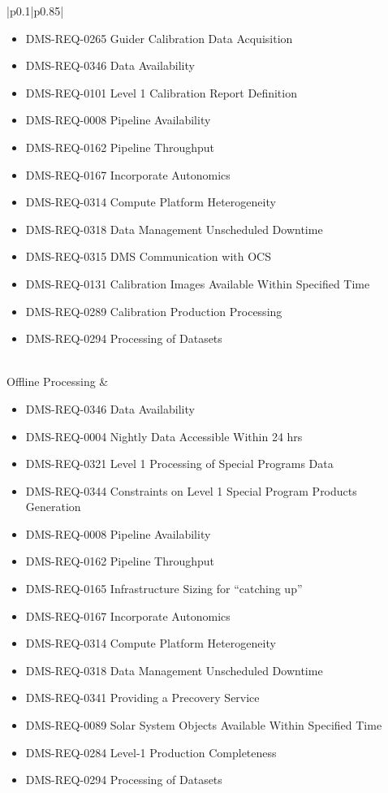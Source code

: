 \documentclass[DM,lsstdraft,toc]{lsstdoc}
\begin{document}
\begin{xtabular}{|p{0.1\textwidth}|p{0.85\textwidth}|}
\begin{itemize}
\item DMS-REQ-0265 Guider Calibration Data Acquisition
\item DMS-REQ-0346 Data Availability
\item DMS-REQ-0101 Level 1 Calibration Report Definition
\item DMS-REQ-0008 Pipeline Availability
\item DMS-REQ-0162 Pipeline Throughput
\item DMS-REQ-0167 Incorporate Autonomics
\item DMS-REQ-0314 Compute Platform Heterogeneity
\item DMS-REQ-0318 Data Management Unscheduled Downtime
\item DMS-REQ-0315 DMS Communication with OCS
\item DMS-REQ-0131 Calibration Images Available Within Specified Time
\item DMS-REQ-0289 Calibration Production Processing
\item DMS-REQ-0294 Processing of Datasets \end{itemize} \\ \hline
Offline Processing &
\begin{itemize} \item DMS-REQ-0346 Data Availability
\item DMS-REQ-0004 Nightly Data Accessible Within 24 hrs
\item DMS-REQ-0321 Level 1 Processing of Special Programs Data
\item DMS-REQ-0344 Constraints on Level 1 Special Program Products Generation
\item DMS-REQ-0008 Pipeline Availability
\item DMS-REQ-0162 Pipeline Throughput
\item DMS-REQ-0165 Infrastructure Sizing for ``catching up''
\item DMS-REQ-0167 Incorporate Autonomics
\item DMS-REQ-0314 Compute Platform Heterogeneity
\item DMS-REQ-0318 Data Management Unscheduled Downtime
\item DMS-REQ-0341 Providing a Precovery Service
\item DMS-REQ-0089 Solar System Objects Available Within Specified Time
\item DMS-REQ-0284 Level-1 Production Completeness
\item DMS-REQ-0294 Processing of Datasets \end{itemize} \\ \hline

\end{xtabular}
\end{document}
